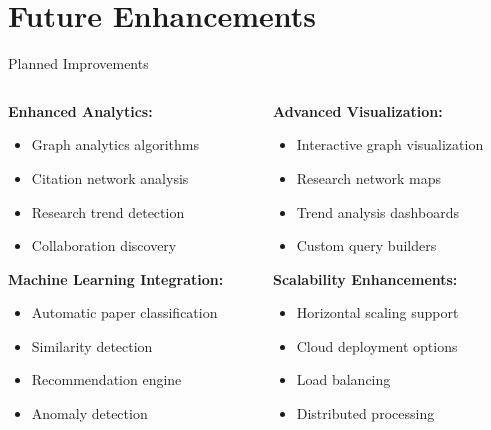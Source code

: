 \documentclass[aspectratio=169]{beamer}
\begin{document}
\section{Future Enhancements}

\begin{frame}{Planned Improvements}
    \begin{columns}[c]
        \begin{column}{0.5\textwidth}
            \textbf{Enhanced Analytics:}
            \begin{itemize}
                \item Graph analytics algorithms
                \item Citation network analysis
                \item Research trend detection
                \item Collaboration discovery
            \end{itemize}
            
            \vspace{0.3cm}
            
            \textbf{Machine Learning Integration:}
            \begin{itemize}
                \item Automatic paper classification
                \item Similarity detection
                \item Recommendation engine
                \item Anomaly detection
            \end{itemize}
        \end{column}
        \begin{column}{0.5\textwidth}
            \textbf{Advanced Visualization:}
            \begin{itemize}
                \item Interactive graph visualization
                \item Research network maps
                \item Trend analysis dashboards
                \item Custom query builders
            \end{itemize}
            
            \vspace{0.3cm}
            
            \textbf{Scalability Enhancements:}
            \begin{itemize}
                \item Horizontal scaling support
                \item Cloud deployment options
                \item Load balancing
                \item Distributed processing
            \end{itemize}
        \end{column}
    \end{columns}
\end{frame}
\end{document}
